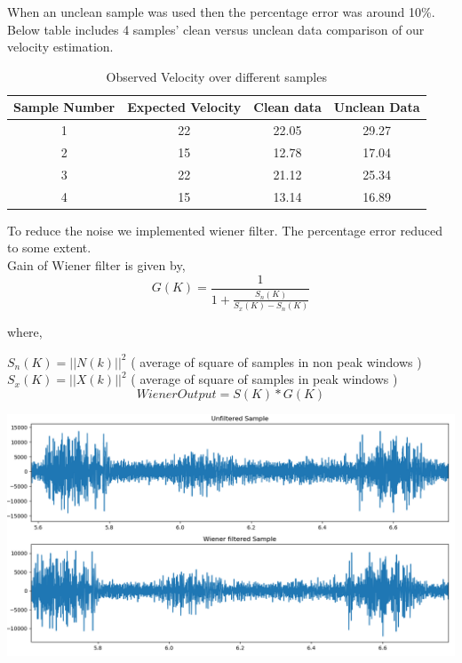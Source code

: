 \documentclass[BTech]{nitkdiss}
\begin{document}
\hspace{0.4cm} When an unclean sample was used then the percentage error was around 10\%. Below table includes 4 samples' clean versus unclean data comparison of our velocity estimation. \\


\begin {table}
\caption {Observed Velocity over different samples}
\begin{center}
 \begin{tabular}{||c| c| c| c||} 
 \hline
 Sample Number & Expected Velocity & Clean data & Unclean Data \\ [0.5ex] 
 \hline\hline
 1 & 22 & 22.05 & 29.27 \\ 
 \hline
 2 & 15 & 12.78 & 17.04 \\
 \hline
 3 & 22 & 21.12 & 25.34 \\
 \hline
 4 & 15 & 13.14 & 16.89 \\ [1ex] 
 \hline
\end{tabular}
\end{center}
\end{table}

\hspace{0.4cm} To reduce the noise we implemented wiener filter. The percentage error reduced to some extent.\\

Gain of Wiener filter is given by, \\
\begin{equation}
G(K) = \frac{1}{1 + \frac{S_n(K)}{S_x(K)-S_n(K)}}
\end{equation}

where,

$S_n(K) = || N(k) ||^2 $ ( average of square of samples in non peak windows ) \\
$S_x(K) = || X(k) ||^2 $ ( average of square of samples in peak windows )\\

\begin{equation}
Wiener Output = S(K) * G(K)
\end{equation}

\begin{center}
\includegraphics[scale = 0.4]{wiener.png}
\end{center}
\end{document}
